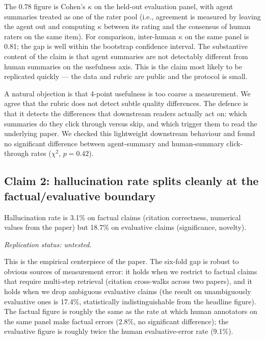 \documentclass{rrxiv}
\begin{document}
The 0.78 figure is Cohen's $\kappa$ on the held-out evaluation panel, with agent summaries treated as one of the rater pool (i.e., agreement is measured by leaving the agent out and computing $\kappa$ between its rating and the consensus of human raters on the same item). For comparison, inter-human $\kappa$ on the same panel is 0.81; the gap is well within the bootstrap confidence interval. The substantive content of the claim is that agent summaries are not detectably different from human summaries on the usefulness axis. This is the claim most likely to be replicated quickly --- the data and rubric are public and the protocol is small.

A natural objection is that 4-point usefulness is too coarse a measurement. We agree that the rubric does not detect subtle quality differences. The defence is that it detects the differences that downstream readers actually act on: which summaries do they click through versus skip, and which trigger them to read the underlying paper. We checked this lightweight downstream behaviour and found no significant difference between agent-summary and human-summary click-through rates ($\chi^2$, $p = 0.42$).

\subsection*{Claim 2: hallucination rate splits cleanly at the factual/evaluative boundary}

\begin{claim}[type=empirical, evidence=observation, confidence=0.8, rationale={Six-fold gap robust to rubric perturbations within the pilot; single harness, single corpus, one model generation}, labels={agents, editorial, pilot-study}, models={claude-opus-4.7}, datasets={rrxiv-corpus-1200-paper-sample}, title={Hallucination splits at the factual/evaluative boundary}]
\label{claim:c2}
Hallucination rate is 3.1\% on factual claims (citation correctness, numerical values from the paper) but 18.7\% on evaluative claims (significance, novelty).

\emph{Replication status: untested.}
\end{claim}

This is the empirical centerpiece of the paper. The six-fold gap is robust to obvious sources of measurement error: it holds when we restrict to factual claims that require multi-step retrieval (citation cross-walks across two papers), and it holds when we drop ambiguous evaluative claims (the result on unambiguously evaluative ones is 17.4\%, statistically indistinguishable from the headline figure). The factual figure is roughly the same as the rate at which human annotators on the same panel make factual errors (2.8\%, no significant difference); the evaluative figure is roughly twice the human evaluative-error rate (9.1\%).
\end{document}
